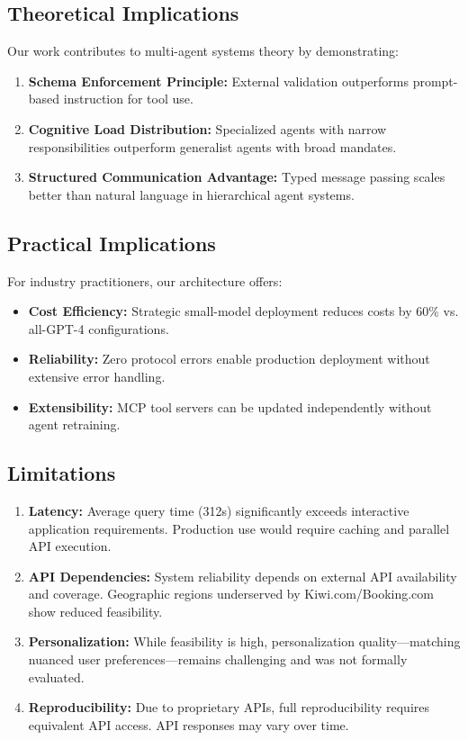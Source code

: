 \documentclass[preprint,review,12pt]{elsarticle}
\begin{document}
\subsection{Theoretical Implications}

Our work contributes to multi-agent systems theory by demonstrating:

\begin{enumerate}
    \item \textbf{Schema Enforcement Principle:} External validation outperforms prompt-based instruction for tool use.
    \item \textbf{Cognitive Load Distribution:} Specialized agents with narrow responsibilities outperform generalist agents with broad mandates.
    \item \textbf{Structured Communication Advantage:} Typed message passing scales better than natural language in hierarchical agent systems.
\end{enumerate}

\subsection{Practical Implications}

For industry practitioners, our architecture offers:

\begin{itemize}
    \item \textbf{Cost Efficiency:} Strategic small-model deployment reduces costs by 60\% vs. all-GPT-4 configurations.
    \item \textbf{Reliability:} Zero protocol errors enable production deployment without extensive error handling.
    \item \textbf{Extensibility:} MCP tool servers can be updated independently without agent retraining.
\end{itemize}

\subsection{Limitations}

\begin{enumerate}
    \item \textbf{Latency:} Average query time (312s) significantly exceeds interactive application requirements. Production use would require caching and parallel API execution.
    
    \item \textbf{API Dependencies:} System reliability depends on external API availability and coverage. Geographic regions underserved by Kiwi.com/Booking.com show reduced feasibility.
    
    \item \textbf{Personalization:} While feasibility is high, personalization quality---matching nuanced user preferences---remains challenging and was not formally evaluated.
    
    \item \textbf{Reproducibility:} Due to proprietary APIs, full reproducibility requires equivalent API access. API responses may vary over time.
\end{enumerate}
\end{document}
